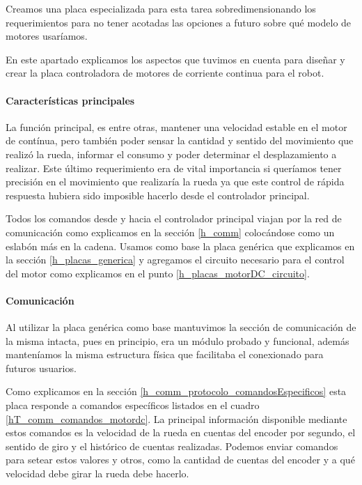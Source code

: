 Creamos una placa especializada para esta tarea sobredimensionando los requerimientos para no tener acotadas las opciones
a futuro sobre qu\'e modelo de motores usar\'iamos.

En este apartado explicamos los aspectos que tuvimos en cuenta para dise\~nar y crear la placa controladora de motores
de corriente continua para el robot.

\paragraph{Caracter\'isticas principales}
\label{h_placas_motorDC_caracteristicas}

La funci\'on principal, es entre otras, mantener una velocidad estable en el motor de cont\'inua, pero tambi\'en poder sensar la cantidad
y sentido del movimiento que realiz\'o la rueda, informar el consumo y poder determinar el desplazamiento a realizar.
Este \'ultimo requerimiento era de vital importancia si quer\'iamos tener precisi\'on en el movimiento que realizar\'ia la rueda
ya que este control de r\'apida respuesta hubiera sido imposible hacerlo desde el controlador principal.

Todos los comandos desde y hacia el controlador principal viajan por la red de comunicaci\'on como explicamos en la secci\'on
\ref{h_comm} coloc\'andose como un eslab\'on m\'as en la cadena.
Usamos como base la placa gen\'erica que explicamos en la secci\'on \ref{h_placas_generica} y agregamos el circuito necesario para
el control del motor como explicamos en el punto \ref{h_placas_motorDC_circuito}.

\paragraph{Comunicaci\'on}
\label{h_placas_motorDC_comm}

Al utilizar la placa gen\'erica como base mantuvimos la secci\'on de comunicaci\'on de la misma intacta, pues
en principio, era un m\'odulo probado y funcional, adem\'as manten\'iamos la misma estructura f\'isica que
facilitaba el conexionado para futuros usuarios.

Como explicamos en la secci\'on \ref{h_comm_protocolo_comandosEspecificos} esta placa responde a comandos
espec\'ificos listados en el cuadro \ref{hT_comm_comandos_motordc}.
La principal informaci\'on disponible mediante estos comandos es la velocidad de la rueda en cuentas del
encoder por segundo, el sentido de giro y el hist\'orico de cuentas realizadas.
Podemos enviar comandos para setear estos valores y otros, como la cantidad de cuentas del encoder y a qu\'e
velocidad debe girar la rueda debe hacerlo.

